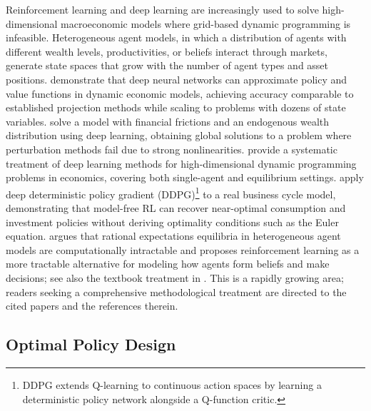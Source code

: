 Reinforcement learning and deep learning are increasingly used to solve high-dimensional macroeconomic models where grid-based dynamic programming is infeasible. Heterogeneous agent models, in which a distribution of agents with different wealth levels, productivities, or beliefs interact through markets, generate state spaces that grow with the number of agent types and asset positions. \citet{MaliarMaliarWinant2021} demonstrate that deep neural networks can approximate policy and value functions in dynamic economic models, achieving accuracy comparable to established projection methods while scaling to problems with dozens of state variables. \citet{FernandezVillaverdeHurtadoNuno2023} solve a model with financial frictions and an endogenous wealth distribution using deep learning, obtaining global solutions to a problem where perturbation methods fail due to strong nonlinearities. \citet{FernandezVillaverdeNunoPerla2024} provide a systematic treatment of deep learning methods for high-dimensional dynamic programming problems in economics, covering both single-agent and equilibrium settings. \citet{AtashbarShi2023} apply deep deterministic policy gradient (DDPG)\footnote{DDPG extends Q-learning to continuous action spaces by learning a deterministic policy network alongside a Q-function critic.} to a real business cycle model, demonstrating that model-free RL can recover near-optimal consumption and investment policies without deriving optimality conditions such as the Euler equation. \citet{Moll2025} argues that rational expectations equilibria in heterogeneous agent models are computationally intractable and proposes reinforcement learning as a more tractable alternative for modeling how agents form beliefs and make decisions; see also the textbook treatment in \citet{Zhao2025}. This is a rapidly growing area; readers seeking a comprehensive methodological treatment are directed to the cited papers and the references therein.


\subsection{Optimal Policy Design}

